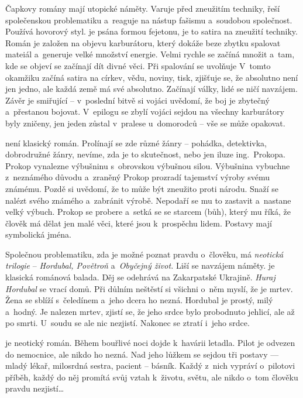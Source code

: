 Čapkovy romány mají utopické náměty. Varuje před zneužitím techniky,
řeší společenskou problematiku a~reaguje na nástup fašismu a~soudobou
společnost. Používá hovorový styl.  je psána
formou fejetonu, je to satira na zneužití techniky. Román je založen na
objevu karburátoru, který dokáže beze zbytku spalovat mateiál a~generuje
velké množství energie. Velmi rychle se začíná množit a~tam, kde se
objeví se začínají dít divné věci. Při spalování se uvolňuje
 V~tomto okamžiku začíná satira na církev, vědu, noviny,
tisk, zjišťuje se, že absolutno není jen jedno, ale každá země má své
absolutno. Začínají války, lidé se ničí navzájem. Závěr je smiřující --
v~poslední bitvě si vojáci uvědomí, že boj je zbytečný a~přestanou
bojovat. V~epilogu se zbylí vojáci sejdou na  všechny
karburátory byly zničeny, jen jeden zůstal v~pralese u~domorodců -- vše
se může opakovat.

 není klasický román. Prolínají se zde různé žánry --
pohádka, detektivka, dobrodružné žánry, nevíme, zda je to skutečnost,
nebo jen iluze ing.~Prokopa. Prokop vynalezne výbušninu s~obrovskou
výbušnou silou. Výbušnina vybuchne z~neznámého důvodu a~zraněný Prokop
prozradí tajemství výroby svému známému. Pozdě si uvědomí, že to může
být zneužito proti národu. Snaží se nalézt svého známého a~zabránit
výrobě. Nepodaří se mu to zastavit a~nastane velký výbuch. Prokop se
probere a~setká se se starcem (bůh), který mu říká, že člověk má dělat
jen malé věci, které jsou k~prospěchu lidem. Postavy mají symbolická
jména.

Společnou problematiku, zda je možné poznat pravdu o~člověku, má
\emph{neotická trilogie} -- \emph{Hordubal, Povětroň} a~\emph{Obyčejný život.} 
Liší se navzájem náměty.  je klasická románová balada.
Děj se odehrává na Zakarpatské Ukrajině. \emph{Huraj Hordubal} se vrací
domů. Při důlním neštěstí si všichni o~něm myslí, že je mrtev. Žena se
sblíží s~čeledínem a~jeho dcera ho nezná. Hordubal je prostý, milý
a~hodný. Je nalezen mrtev, zjistí se, že jeho srdce bylo probodnuto
jehlicí, ale až po smrti. U~soudu se ale nic nezjistí. Nakonec se ztratí
i~jeho srdce.

 je neotický román. Během bouřlivé noci dojde k~havárii
letadla. Pilot je odvezen do nemocnice, ale nikdo ho nezná. Nad jeho
lůžkem se sejdou tři postavy --- mladý lékař, milosrdná sestra, pacient
-- básník. Každý z~nich vypráví o~pilotovi příběh, každý do něj promítá
svůj vztah k~životu, světu, ale nikdo o~tom člověku pravdu nezjistí\dots{}

